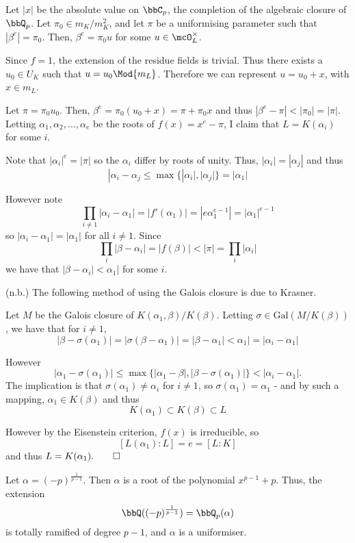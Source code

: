 \documentclass[a4paper, 12pt,oneside,openany]{book}
\begin{document}
 Let $|x|$ be the absolute value on $\bbC_p$, the completion of the algebraic closure of $\bbQ_p$. Let $\pi_0 \in m_K / m_K^2$, and let $\pi$ be a uniformising parameter such that $|\beta^e|=\pi_0.$ Then, $\beta^e = \pi_0 u$ for some $u \in \mcO_L^\times$. 

Since $f=1$, the extension of the residue fields is trivial. Thus there exists a $u_0 \in U_K$ such that $u = u_0 \Mod{m_L}$. Therefore we can represent $u=u_0+x$, with $x \in m_L$. 

Let $\pi = \pi_0 u_0$. Then, $\beta^e = \pi_0(u_0+x) = \pi + \pi_0x$ and thus $|\beta^e-\pi|<|\pi_0|=|\pi|$. Letting $\alpha_1, \alpha_2, \dots, \alpha_e$ be the roots of $f(x)=x^e-\pi$, I claim that $L=K(\alpha_i)$ for some $i$.

Note that $|\alpha_i|^e = |\pi|$ so the $\alpha_i$ differ by roots of unity. Thus, $|\alpha_i|=|\alpha_j|$ and thus $$|\alpha_i-\alpha_j \leq \max\{|\alpha_i|, |\alpha_j|\}=|\alpha_1|$$

However note $$\prod\limits_{i \neq 1} |\alpha_i - \alpha_1| = |f'(\alpha_1)| = |e\alpha_1^{e-1}| = |\alpha_1|^{e-1}$$ so $|\alpha_i-\alpha_1|=|\alpha_1|$ for all $i \neq 1.$ Since $$\prod\limits_i |\beta-\alpha_i| = |f(\beta)| < |\pi| = \prod\limits_i |\alpha_i|$$ we have that $|\beta-\alpha_i|<\alpha_1|$ for some $i$. 

(n.b.) The following method of using the Galois closure is due to Krasner.

Let $M$ be the Galois closure of $K(\alpha_1, \beta)/K(\beta)$. Letting $\sigma \in \text{Gal}(M/K(\beta))$, we have that for $i\neq 1$, $$|\beta-\sigma(\alpha_1)| = |\sigma(\beta-\alpha_1)| = |\beta-\alpha_1| < \alpha_1| = |\alpha_i-\alpha_1|$$ 

However $$|\alpha_1 - \sigma(\alpha_1)| \leq \max\{|\alpha_1-\beta|, |\beta-\sigma(\alpha_1)|\} < |\alpha_i-\alpha_1|.$$ The implication is that $\sigma(\alpha_1) \neq \alpha_i$ for $i \neq 1$, so $\sigma(\alpha_1)=\alpha_1$ - and by such a mapping, $\alpha_1 \in K(\beta)$ and thus $$K(\alpha_1) \subset K(\beta) \subset L$$ 

However by the Eisenstein criterion, $f(x)$ is irreducible, so $$[L(\alpha_1):L]=e=[L:K]$$ and thus $L=K(\alpha_1). \qed$


 Let $\alpha = (-p)^{\frac{1}{p-1}}$. Then $\alpha$ is a root of the polynomial $x^{p-1}+p$. Thus, the extension $$\bbQ((-p)^{\frac{1}{p-1}}) = \bbQ_p(\alpha)$$ is totally ramified of degree $p-1$, and $\alpha$ is a uniformiser. 
\end{document}
